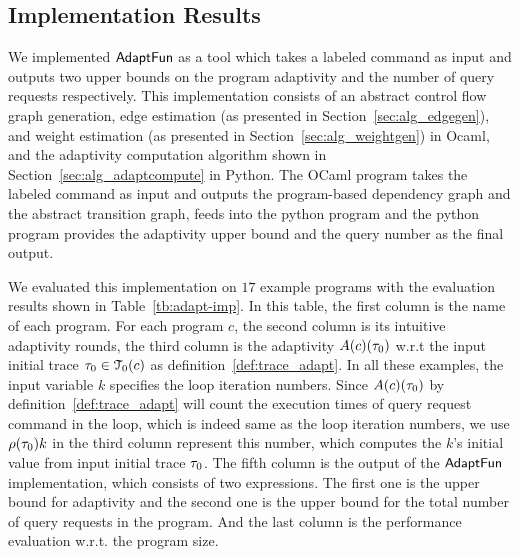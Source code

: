 \subsection{Implementation Results}
We implemented $\textsf{AdaptFun}$ as a tool which takes a labeled command as input  
and outputs two upper bounds on the program adaptivity and the number of query requests respectively.
This implementation consists of an 
abstract control flow graph generation,
edge estimation (as presented in Section~\ref{sec:alg_edgegen}), and weight estimation (as presented in Section~\ref{sec:alg_weightgen}) in Ocaml, 
and the adaptivity computation algorithm shown in Section~\ref{sec:alg_adaptcompute} in Python.
The OCaml program takes the labeled command as input and outputs the program-based dependency graph and
the abstract transition graph,
feeds into the python program and the python program provides the adaptivity upper bound and the query number as the final output.

We evaluated this implementation on $17$ example programs with the evaluation results shown in Table~\ref{tb:adapt-imp}.
In this table,
the first column is the name of each program.
For each program $c$, the second column is its intuitive adaptivity rounds,
the third column is the adaptivity $A(c)(\mathtt{\tau}_0)$ w.r.t the input initial trace $\mathtt{\tau}_0 \in \mathcal{T}_0(c)$ as definition~\ref{def:trace_adapt}.
In all these examples, the input variable $k$ specifies the loop iteration numbers.
Since $A(c)(\mathtt{\tau}_0)$ by definition~\ref{def:trace_adapt} will count the execution times of
query request command in the loop, which is indeed same as  the loop iteration numbers,
we use $\rho(\mathtt{\tau}_0) k$ in the third column represent this number, which computes the $k$'s initial value from input initial trace $\mathtt{\tau}_0$.
The fifth column is the output of the $\textsf{AdaptFun}$ implementation, which consists of two expressions.
The first one is the upper bound for adaptivity and the second one is the 
upper bound for the total number of query requests in the program. And the last column is the performance evaluation w.r.t. the program size.

